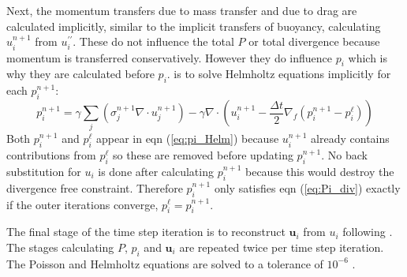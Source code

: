\documentclass[draft]{agujournal2019}
\begin{document}
Next, the momentum transfers due to mass transfer and due to drag
are calculated implicitly, similar to the implicit transfers of buoyancy,
calculating $u_{i}^{n+1}$ from $u_{i}^{\prime\prime}$. These do
not influence the total $P$ or total divergence because momentum
is transferred conservatively. However they do influence $p_{i}$
which is why they are calculated before $p_{i}$. 
is to solve Helmholtz equations implicitly for each $p_{i}^{n+1}$:
\begin{equation}
p_{i}^{n+1} = \gamma \sum_j \left(\sigma^{n+1}_j \nabla\cdot u_j^{n+1} \right)
-\gamma\nabla\cdot
\left(u_{i}^{n+1}-\frac{\Delta t}{2}\nabla_{f}\left(p_{i}^{n+1}-p_{i}^{\ell}\right)\right)
\label{eq:pi_Helm}
\end{equation}
Both $p_{i}^{n+1}$ and $p_{i}^{\ell}$ appear in eqn (\ref{eq:pi_Helm})
because $u_{i}^{n+1}$ already contains contributions from $p_{i}^{\ell}$
so these are removed before updating $p_{i}^{n+1}$. No back substitution
for $u_{i}$ is done after calculating $p_{i}^{n+1}$ because this
would destroy the divergence free constraint. Therefore $p_{i}^{n+1}$
only satisfies eqn (\ref{eq:Pi_div}) exactly if the outer iterations
converge,  $p_{i}^{\ell}=p_{i}^{n+1}$. 

The final stage of the time step iteration is to reconstruct $\mathbf{u}_{i}$
from $u_{i}$ following . The stages calculating $P$,
$p_{i}$ and $\mathbf{u}_{i}$ are repeated twice per time step iteration.
The Poisson and Helmholtz equations are solved to a tolerance of $10^{-6}$
.

\subsection{\label{sec:cAveraging} }

\end{document}
